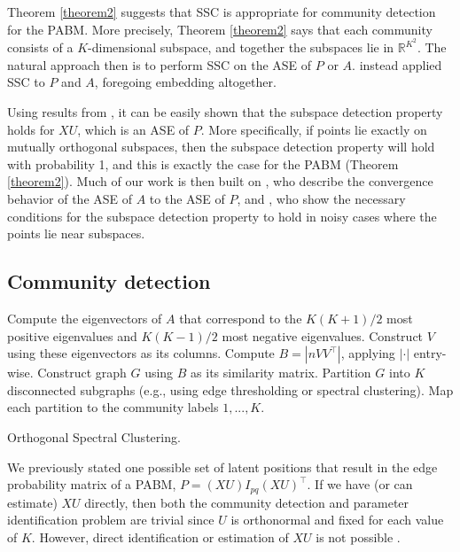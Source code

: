 \documentclass[12pt]{article}
\begin{document}
Theorem \ref{theorem2} suggests that SSC is appropriate for community
detection for the PABM. More precisely, Theorem \ref{theorem2} says that
each community consists of a \(K\)-dimensional subspace, and together
the subspaces lie in \(\mathbb{R}^{K^2}\). The natural approach then is
to perform SSC on the ASE of \(P\) or \(A\).
\citeauthor{noroozi2019estimation} instead applied SSC to \(P\) and
\(A\), foregoing embedding altogether.

Using results from \citet{soltanolkotabi2012}, it can be easily shown
that the subspace detection property holds for \(XU\), which is an ASE
of \(P\). More specifically, if points lie exactly on mutually
orthogonal subspaces, then the subspace detection property will hold
with probability 1, and this is exactly the case for the PABM (Theorem
\ref{theorem2}). Much of our work is then built on
\citeauthor{rubindelanchy2017statistical}, who describe the convergence
behavior of the ASE of \(A\) to the ASE of \(P\), and
\citet{jmlr-v28-wang13}, who show the necessary conditions for the
subspace detection property to hold in noisy cases where the points lie
near subspaces.

\hypertarget{community-detection}{%
\subsection{Community detection}\label{community-detection}}

\begin{algorithm}[t]
  \DontPrintSemicolon
  \SetAlgoLined
    Compute the eigenvectors of $A$ that correspond to the $K (K+1) / 2$ most 
    positive eigenvalues and $K (K-1) / 2$ most negative eigenvalues. Construct 
    $V$ using these eigenvectors as its columns.\;
    Compute $B = |n V V^\top|$, applying $|\cdot|$ entry-wise.\;
    Construct graph $G$ using $B$ as its similarity matrix.\;
    Partition $G$ into $K$ disconnected subgraphs  
    (e.g., using edge thresholding or spectral clustering).\;
    Map each partition to the community labels $1, ..., K$.\;
  \caption{Orthogonal Spectral Clustering.}
\end{algorithm}

We previously stated one possible set of latent positions that result in
the edge probability matrix of a PABM, \(P = (XU) I_{pq} (XU)^\top\). If
we have (or can estimate) \(XU\) directly, then both the community
detection and parameter identification problem are trivial since \(U\)
is orthonormal and fixed for each value of \(K\). However, direct
identification or estimation of \(XU\) is not possible
\cite{rubindelanchy2017statistical}.
\end{document}
